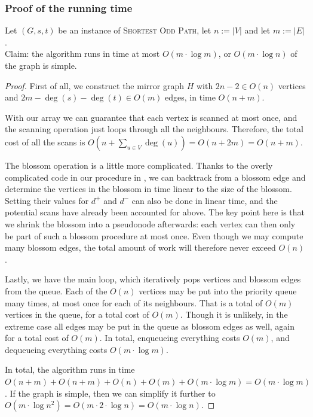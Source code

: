 \subsubsection*{Proof of the running time}
Let $(G,s,t)$ be an instance of \textsc{Shortest Odd Path}, let $n := |V|$ and let $m := |E|$. \\
Claim: the algorithm runs in time at most $O(m \cdot \log m)$, or $O(m \cdot \log n)$ of the graph is simple.
\begin{proof}  
    First of all, we construct the mirror graph $H$ with $2n-2 \in O(n)$ vertices and $2m - \deg(s) - \deg(t) \in O(m)$ edges, in time $O(n+m)$.
    
    With our  array we can guarantee that each vertex is scanned at most once, and the scanning operation just loops through all the neighbours. Therefore, the total cost of all the scans is $O(n + \sum_{u \in V} \deg(u)) = O(n + 2m) = O(n + m)$.

    The blossom operation is a little more complicated. Thanks to the overly complicated code in our  procedure in , we can backtrack from a blossom edge and determine the vertices in the blossom in time linear to the size of the blossom. Setting their values for $d^+$ and $d^-$ can also be done in linear time, and the potential scans have already been accounted for above. The key point here is that we shrink the blossom into a pseudonode afterwards: each vertex can then only be part of such a blossom procedure at most once. Even though we may compute many blossom edges, the total amount of work will therefore never exceed $O(n)$.

    Lastly, we have the main loop, which iteratively pops vertices and blossom edges from the queue. Each of the $O(n)$ vertices may be put into the priority queue many times, at most once for each of its neighbours. That is a total of $O(m)$ vertices in the queue, for a total cost of $O(m)$. Though it is unlikely, in the extreme case all edges may be put in the queue as blossom edges as well, again for a total cost of $O(m)$. In total, enqueueing everything costs $O(m)$, and dequeueing everything costs $O(m \cdot \log m)$.

    In total, the algorithm runs in time $O(n+m) + O(n+m) + O(n) + O(m) + O(m \cdot \log m) = O(m \cdot \log m)$.
    If the graph is simple, then we can simplify it further to $O(m \cdot \log n^2) = O(m \cdot 2 \cdot \log n) = O(m \cdot \log n)$.
\end{proof}

